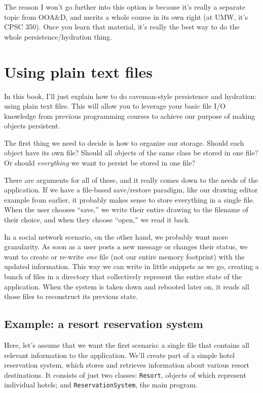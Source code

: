 The reason I won't go further into this option is because it's really a
separate topic from OOA\&D, and merits a whole course in its own right (at
UMW, it's CPSC 350). Once you learn that material, it's really the best way to
do the whole persistence/hydration thing.

\section{Using plain text files}

In this book, I'll just explain how to do caveman-style persistence and
hydration: using plain text files. This will allow you to leverage your basic
file I/O knowledge from previous programming courses to achieve our purpose of
making objects persistent.

The first thing we need to decide is how to organize our storage. Should each
object have its own file? Should all objects of the same class be stored in
one file? Or should \textit{everything} we want to persist be stored in one
file?

There are arguments for all of these, and it really comes down to the needs of
the application. If we have a file-based save/restore paradigm, like our
drawing editor example from earlier, it probably makes sense to store
everything in a single file. When the user chooses ``save,'' we write their
entire drawing to the filename of their choice, and when they choose ``open,''
we read it back.

In a social network scenario, on the other hand, we probably want more
granularity. As soon as a user posts a new message or changes their status, we
want to create or re-write \textit{one} file (not our entire memory footprint)
with the updated information. This way we can write in little snippets as we
go, creating a bunch of files in a directory that collectively represent the
entire state of the application. When the system is taken down and rebooted
later on, it reads all those files to reconstruct its previous state.

\subsection{Example: a resort reservation system}
\label{sec:resortExample}

Here, let's assume that we want the first scenario: a single file that
contains all relevant information to the application. We'll create part of a
simple hotel reservation system, which stores and retrieves information about
various resort destinations. It consists of just two classes: \texttt{Resort},
objects of which represent individual hotels; and \texttt{ReservationSystem},
the main program.

